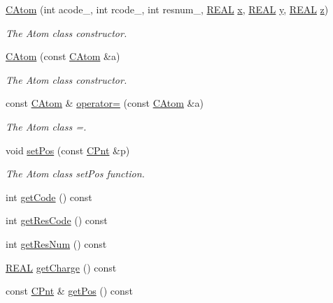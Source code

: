 \begin{DoxyCompactItemize}
\item 
\hyperlink{classCAtom_a72956a614691046daa3f9cb679337c85}{C\-Atom} (int acode\-\_\-, int rcode\-\_\-, int resnum\-\_\-, \hyperlink{util_8h_a5821460e95a0800cf9f24c38915cbbde}{R\-E\-A\-L} \hyperlink{classCAtom_a4c911762af7a8abf5fec08d3a896e5df}{x}, \hyperlink{util_8h_a5821460e95a0800cf9f24c38915cbbde}{R\-E\-A\-L} \hyperlink{classCAtom_a63db481ebb7d5b7d96014d70e020acc2}{y}, \hyperlink{util_8h_a5821460e95a0800cf9f24c38915cbbde}{R\-E\-A\-L} \hyperlink{classCAtom_ae5ce32de61ffe6f35f7790de5c805bd4}{z})
\begin{DoxyCompactList}\small\item\em The Atom class constructor. \end{DoxyCompactList}\item 
\hyperlink{classCAtom_a55b4b673562699ae2fa4e3386b8d8a9b}{C\-Atom} (const \hyperlink{classCAtom}{C\-Atom} \&a)
\begin{DoxyCompactList}\small\item\em The Atom class constructor. \end{DoxyCompactList}\item 
const \hyperlink{classCAtom}{C\-Atom} \& \hyperlink{classCAtom_a52de68ec7c9d0b50599bcb24c05fbc41}{operator=} (const \hyperlink{classCAtom}{C\-Atom} \&a)
\begin{DoxyCompactList}\small\item\em The Atom class =. \end{DoxyCompactList}\item 
void \hyperlink{classCAtom_a214045c9b46083ef550c214d3f1a33bd}{set\-Pos} (const \hyperlink{classCPnt}{C\-Pnt} \&p)
\begin{DoxyCompactList}\small\item\em The Atom class set\-Pos function. \end{DoxyCompactList}\item 
int \hyperlink{classCAtom_a2eaa281b7aa53c83c13a66de07c9e70c}{get\-Code} () const 
\item 
int \hyperlink{classCAtom_a02f2c6f689a978639b239f0b17ccdf1e}{get\-Res\-Code} () const 
\item 
int \hyperlink{classCAtom_a6af9e202834bac9613129184d62e1c19}{get\-Res\-Num} () const 
\item 
\hyperlink{util_8h_a5821460e95a0800cf9f24c38915cbbde}{R\-E\-A\-L} \hyperlink{classCAtom_a909e61ce36305e5e923fd75d48ab6cb8}{get\-Charge} () const 
\item 
const \hyperlink{classCPnt}{C\-Pnt} \& \hyperlink{classCAtom_ad53ff83c6676d072a06694a4398b257d}{get\-Pos} () const 

\end{DoxyCompactItemize}
